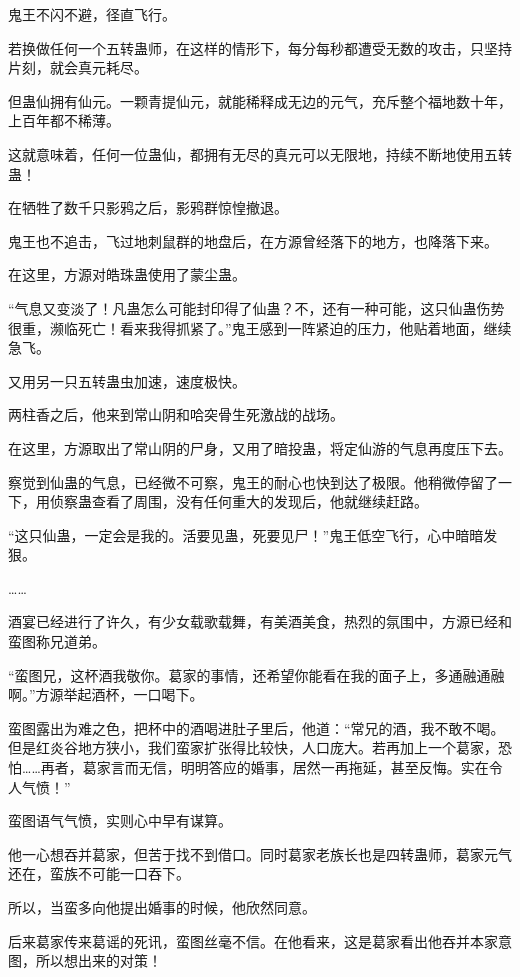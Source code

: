 \begin{this_body}
鬼王不闪不避，径直飞行。

若换做任何一个五转蛊师，在这样的情形下，每分每秒都遭受无数的攻击，只坚持片刻，就会真元耗尽。

但蛊仙拥有仙元。一颗青提仙元，就能稀释成无边的元气，充斥整个福地数十年，上百年都不稀薄。

这就意味着，任何一位蛊仙，都拥有无尽的真元可以无限地，持续不断地使用五转蛊！

在牺牲了数千只影鸦之后，影鸦群惊惶撤退。

鬼王也不追击，飞过地刺鼠群的地盘后，在方源曾经落下的地方，也降落下来。

在这里，方源对皓珠蛊使用了蒙尘蛊。

“气息又变淡了！凡蛊怎么可能封印得了仙蛊？不，还有一种可能，这只仙蛊伤势很重，濒临死亡！看来我得抓紧了。”鬼王感到一阵紧迫的压力，他贴着地面，继续急飞。

又用另一只五转蛊虫加速，速度极快。

两柱香之后，他来到常山阴和哈突骨生死激战的战场。

在这里，方源取出了常山阴的尸身，又用了暗投蛊，将定仙游的气息再度压下去。

察觉到仙蛊的气息，已经微不可察，鬼王的耐心也快到达了极限。他稍微停留了一下，用侦察蛊查看了周围，没有任何重大的发现后，他就继续赶路。

“这只仙蛊，一定会是我的。活要见蛊，死要见尸！”鬼王低空飞行，心中暗暗发狠。

……

酒宴已经进行了许久，有少女载歌载舞，有美酒美食，热烈的氛围中，方源已经和蛮图称兄道弟。

“蛮图兄，这杯酒我敬你。葛家的事情，还希望你能看在我的面子上，多通融通融啊。”方源举起酒杯，一口喝下。

蛮图露出为难之色，把杯中的酒喝进肚子里后，他道：“常兄的酒，我不敢不喝。但是红炎谷地方狭小，我们蛮家扩张得比较快，人口庞大。若再加上一个葛家，恐怕……再者，葛家言而无信，明明答应的婚事，居然一再拖延，甚至反悔。实在令人气愤！”

蛮图语气气愤，实则心中早有谋算。

他一心想吞并葛家，但苦于找不到借口。同时葛家老族长也是四转蛊师，葛家元气还在，蛮族不可能一口吞下。

所以，当蛮多向他提出婚事的时候，他欣然同意。

后来葛家传来葛谣的死讯，蛮图丝毫不信。在他看来，这是葛家看出他吞并本家意图，所以想出来的对策！

\end{this_body}

